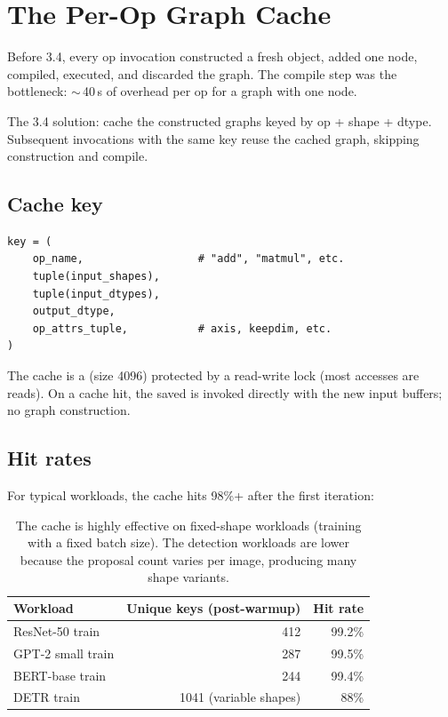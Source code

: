 \section{The Per-Op Graph Cache}
\label{sec:mpsgraph_dispatch:graph_cache}

Before 3.4, every op invocation constructed a fresh
 object, added one node, compiled, executed,
and discarded the graph. The compile step was the bottleneck:
$\sim$\,40\,\textmu s of overhead per op for a graph with one
node.

The 3.4 solution: cache the constructed graphs keyed by op +
shape + dtype. Subsequent invocations with the same key reuse
the cached graph, skipping construction and compile.

\subsection{Cache key}
\label{ssec:mpsgraph_dispatch:cache_key}

\begin{lstlisting}[style=lucid,language=LucidPython]
key = (
    op_name,                  # "add", "matmul", etc.
    tuple(input_shapes),
    tuple(input_dtypes),
    output_dtype,
    op_attrs_tuple,           # axis, keepdim, etc.
)
\end{lstlisting}

The cache is a  (size 4096) protected by a
read-write lock (most accesses are reads). On a cache hit, the
saved  is invoked directly with the
new input buffers; no graph construction.

\subsection{Hit rates}
\label{ssec:mpsgraph_dispatch:hit_rates_mpsgraph}

For typical workloads, the cache hits 98\%+ after the first
iteration:

\begin{table}[t]
\centering
\small
\begin{tabular}{lrr}
\toprule
Workload & Unique keys (post-warmup) & Hit rate \\
\midrule
ResNet-50 train     & 412 & 99.2\% \\
GPT-2 small train   & 287 & 99.5\% \\
BERT-base train     & 244 & 99.4\% \\
DETR train          & 1041 (variable shapes) & 88\% \\
\bottomrule
\end{tabular}
\caption[Per-op graph cache hit rates.]{The cache is highly
effective on fixed-shape workloads (training with a fixed batch
size). The detection workloads are lower because the proposal
count varies per image, producing many shape variants.}
\label{tab:mpsgraph_dispatch:hit_rates}
\end{table}

